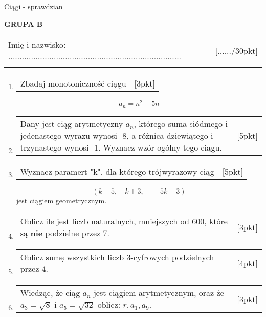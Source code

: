 \documentclass[12pt,a4paper]{article}
\begin{document}
	\begin{center}
	\LARGE Ciągi - sprawdzian
\end{center}
\vspace{1.5cm}
\begin{flushright}
	\textbf{GRUPA B}
\end{flushright}
\begin{tabular}{p{13cm} r}
	Imię i nazwisko: ............................................................................
	&[....../30pkt]\\ 
	\vspace{0.5cm}
\end{tabular}
\begin{enumerate}[1.]
	\item  \begin{tabular}{p{13cm} r}
		Zbadaj monotoniczność ciągu  &[3pkt]\\ 
	\end{tabular}
	$$a_n= n^2 - 5n$$
	
	\item  \begin{tabular}{p{13cm} r}
		Dany jest ciąg arytmetyczny $a_n$, którego suma siódmego i jedenastego wyrazu wynosi -8, a różnica dziewiątego i trzynastego wynosi -1. Wyznacz wzór ogólny tego ciągu. 
		&[5pkt]\\ 
	\end{tabular}
	
	\item \begin{tabular}{p{13cm} r}
		Wyznacz paramert "k", dla którego trójwyrazowy ciąg
		&[5pkt]\\
	\end{tabular}
	$$(k-5,\quad k+3, \quad -5k-3)$$
	jest ciągiem geometrycznym. 
	
	\item \begin{tabular}{p{13cm} r}
		Oblicz ile jest liczb naturalnych, mniejszych od 600, które są \textbf{\underline{nie}} podzielne przez 7.&[3pkt]\\ 
	\end{tabular}
	
	\item \begin{tabular}{p{13cm} r}
		Oblicz sumę wszystkich liczb 3-cyfrowych podzielnych przez 4.&[4pkt]\\ 
	\end{tabular}
	
	\item \begin{tabular}{p{13cm} r}
		Wiedząc, że ciąg $a_n$ jest ciągiem arytmetycznym, oraz że $a_3=\sqrt{8}$ i $a_5=\sqrt{32}$ oblicz: $r,a_1,a_9$. &[3pkt]\\ 
	\end{tabular}
	

\end{enumerate}
\end{document}
